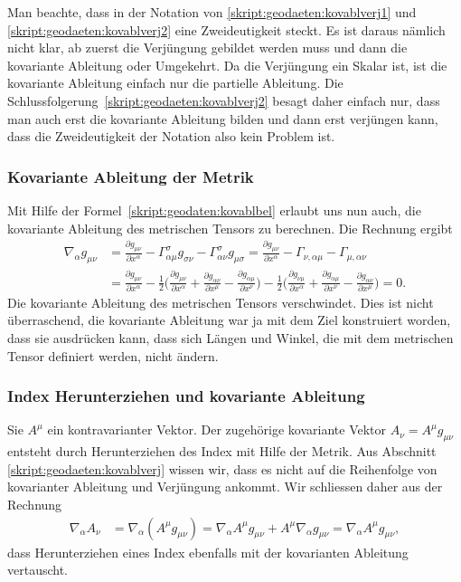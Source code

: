 Man beachte, dass in der Notation von
\eqref{skript:geodaeten:kovablverj1}
und
\eqref{skript:geodaeten:kovablverj2}
eine Zweideutigkeit steckt.
Es ist daraus nämlich nicht klar, ab zuerst die Verjüngung gebildet werden muss
und dann die kovariante Ableitung oder Umgekehrt.
Da die Verjüngung ein Skalar ist, ist die kovariante Ableitung einfach
nur die partielle Ableitung.
Die Schlussfolgerung~\eqref{skript:geodaeten:kovablverj2} besagt daher
einfach nur, dass man auch erst die kovariante Ableitung bilden und
dann erst verjüngen kann, dass die Zweideutigkeit der Notation also
kein Problem ist.

\subsubsection{Kovariante Ableitung der Metrik}
Mit Hilfe der Formel~\eqref{skript:geodaten:kovablbel} erlaubt uns nun
auch, die kovariante Ableitung des metrischen Tensors zu berechnen.
Die Rechnung ergibt
\begin{align*}
\nabla_\alpha g_{\mu\nu}
&=
\frac{\partial g_{\mu\nu}}{\partial x^\alpha}
-\Gamma^\sigma_{\alpha\mu}g_{\sigma\nu}
-\Gamma^\sigma_{\alpha\nu}g_{\mu\sigma}
=
\frac{\partial g_{\mu\nu}}{\partial x^\alpha}
-\Gamma_{\nu,\alpha\mu}
-\Gamma_{\mu,\alpha\nu}
\\
&=
\frac{\partial g_{\mu\nu}}{\partial x^\alpha}
-
\frac12\biggl(
\frac{\partial g_{\mu\nu}}{\partial x^\alpha}
+
\frac{\partial g_{\alpha\nu}}{\partial x^\mu}
-
\frac{\partial g_{\alpha\mu}}{\partial x^\nu}
\biggr)
-
\frac12\biggl(
\frac{\partial g_{\nu\mu}}{\partial x^\alpha}
+
\frac{\partial g_{\alpha\mu}}{\partial x^\nu}
-
\frac{\partial g_{\alpha\nu}}{\partial x^\mu}
\biggr)
=0.
\end{align*}
Die kovariante Ableitung des metrischen Tensors verschwindet.
Dies ist nicht überraschend, die kovariante Ableitung war ja mit dem Ziel
konstruiert worden, dass sie ausdrücken kann, dass sich Längen und
Winkel, die mit dem metrischen Tensor definiert werden, nicht ändern.

\subsubsection{Index Herunterziehen und kovariante Ableitung}
Sie $A^\mu$ ein kontravarianter Vektor.
Der zugehörige kovariante Vektor $A_\nu=A^\mu g_{\mu\nu}$ entsteht
durch Herunterziehen des Index mit Hilfe der Metrik.
Aus Abschnitt \ref{skript:geodaeten:kovablverj} wissen wir, dass es nicht
auf die Reihenfolge von kovarianter Ableitung und Verjüngung ankommt.
Wir schliessen daher aus der Rechnung
\begin{align*}
\nabla_\alpha A_\nu
&=
\nabla_\alpha(A^\mu g_{\mu\nu})
=
\nabla_\alpha A^\mu g_{\mu\nu} + A^\mu\nabla_\alpha g_{\mu\nu}
=
\nabla_\alpha A^\mu g_{\mu\nu},
\end{align*}
dass Herunterziehen eines Index ebenfalls mit der kovarianten Ableitung
vertauscht.

